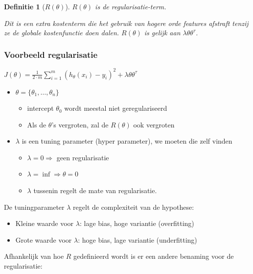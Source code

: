 \documentclass{article}
\newtheorem{theorem}{Definitie}[section]
\begin{document}
\begin{theorem}[$R(\theta)$]
$R(\theta)$ is de regularisatie-term. 

Dit is een extra kostenterm die het gebruik van hogere orde features afstraft
tenzij ze de globale kostenfunctie doen dalen. $R(\theta)$ is gelijk aan $\lambda \theta \theta^{\tau}$.
\end{theorem}

\subsubsection{Voorbeeld regularisatie}

\begin{center}
    $J(\theta) = \frac{1}{2\cdot m} \sum_{i=1}^m (h_{\theta}(x_i) - y_i)^2 + \lambda \theta \theta^{\tau}$
\end{center}

\begin{itemize}
    \item $\theta = \{\theta_1, \dots, \theta_n\}$
    \begin{itemize}
        \item intercept $\theta_0$ wordt meestal niet geregulariseerd
        \item Als de $\theta$'s vergroten, zal de $R(\theta)$ ook vergroten
    \end{itemize}
    \item $\lambda$ is een tuning parameter (hyper parameter), we moeten die zelf vinden
    \begin{itemize}
        \item $\lambda = 0 \Rightarrow$ geen regularisatie
        \item $\lambda = \inf \Rightarrow \theta = 0$ 
        \item $\lambda$ tussenin regelt de mate van regularisatie.
    \end{itemize}
\end{itemize}

De tuningparameter $\lambda$ regelt de complexiteit van de hypothese:

\begin{itemize}
    \item Kleine waarde voor $\lambda$: lage bias, hoge variantie (overfitting)
    \item Grote waarde voor $\lambda$: hoge bias, lage variantie (underfitting)
\end{itemize}

Afhankelijk van hoe $R$ gedefinieerd wordt is er een andere benaming voor de regularisatie:
\end{document}
